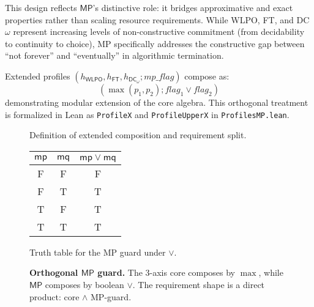 \documentclass[11pt]{article}
\newcommand{\WLPO}{\mathsf{WLPO}}
\newcommand{\FT}{\mathsf{FT}}
\newcommand{\DCw}{\mathsf{DC}_{\omega}}
\newcommand{\MP}{\mathsf{MP}}
\newcommand{\lean}[1]{\texttt{#1}}
\theoremstyle{plain}
\theoremstyle{definition}
\theoremstyle{remark}
\begin{document}
This design reflects $\MP$'s distinctive role: it bridges approximative and exact properties rather than scaling resource requirements. While WLPO, FT, and DC$\omega$ represent increasing levels of non-constructive commitment (from decidability to continuity to choice), MP specifically addresses the constructive gap between ``not forever'' and ``eventually'' in algorithmic termination.

Extended profiles $(h_{\WLPO}, h_{\FT}, h_{\DCw}; \mathit{mp\_flag})$ compose as:
$$(\max(p_1, p_2); \mathit{flag}_1 \lor \mathit{flag}_2)$$
demonstrating modular extension of the core algebra. This orthogonal treatment is formalized in Lean as \lean{ProfileX} and \lean{ProfileUpperX} in \texttt{ProfilesMP.lean}.

\begin{figure}[t]
  \centering
  \begin{minipage}[t]{0.47\linewidth}
    \centering
    \vspace{0.6em}

    \small Definition of extended composition and requirement split.
  \end{minipage}\hfill
  \begin{minipage}[t]{0.47\linewidth}
    \centering
    \setlength{\tabcolsep}{10pt}
    \renewcommand{\arraystretch}{1.2}
    \begin{tabular}{cc|c}
      $\mathsf{mp}$ & $\mathsf{mq}$ & $\mathsf{mp}\lor\mathsf{mq}$ \\\hline
      F & F & F \\
      F & T & T \\
      T & F & T \\
      T & T & T \\
    \end{tabular}

    \vspace{0.6em}
    \small Truth table for the MP guard under $\lor$.
  \end{minipage}

  \caption{\textbf{Orthogonal $\MP$ guard.}
  The 3-axis core composes by $\max$, while $\MP$ composes by boolean $\lor$.
  The requirement shape is a direct product: core $\wedge$ MP-guard.}
  \label{fig:mp-orthogonal}
\end{figure}
\end{document}
